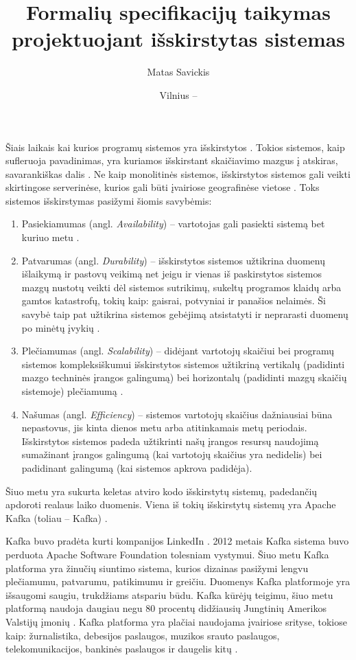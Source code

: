 \documentclass{VUMIFPSmagistrinis}
\title{Formalių specifikacijų taikymas projektuojant išskirstytas sistemas}
\author{Matas Savickis}
\date{Vilnius – \the\year}
\begin{document}
\maketitle

\tableofcontents


		Šiais laikais kai kurios programų sistemos yra išskirstytos \cite{mcr}. 
		Tokios sistemos, kaip sufleruoja pavadinimas, yra kuriamos išskirstant skaičiavimo mazgus į atskiras, savarankiškas dalis \cite{coulouris2005distributed}.
		Ne kaip monolitinės sistemos, išskirstytos sistemos gali veikti skirtingose serverinėse, kurios gali būti įvairiose geografinėse vietose \cite{shirriff2006method}.
		Toks sistemos išskirstymas pasižymi šiomis savybėmis:
		\begin{enumerate}
			\item{Pasiekiamumas (angl. {\it Availability}) -- vartotojas gali pasiekti sistemą bet kuriuo metu \cite{180327}.}
			\item{Patvarumas (angl. {\it Durability}) -- išskirstytos sistemos užtikrina duomenų išlaikymą ir pastovų veikimą net jeigu ir vienas iš paskirstytos sistemos mazgų nustotų veikti dėl sistemos sutrikimų, sukeltų programos klaidų arba gamtos katastrofų, tokių kaip: gaisrai, potvyniai ir panašios nelaimės. Ši savybė taip pat užtikrina sistemos gebėjimą atsistatyti ir neprarasti duomenų po minėtų įvykių \cite{5470366}.}
			\item{Plečiamumas (angl. {\it Scalability}) -- didėjant vartotojų skaičiui bei programų sistemos kompleksiškumui išskirstytos sistemos užtikriną vertikalų (padidinti mazgo techninės įrangos galingumą) bei horizontalų (padidinti mazgų skaičių sistemoje) plečiamumą \cite{862209}.}
			\item{Našumas (angl. {\it Efficiency}) -- sistemos vartotojų skaičius dažniausiai būna nepastovus, jis kinta dienos metu arba atitinkamais metų periodais. Išskirstytos sistemos padeda užtikrinti našų įrangos resursų naudojimą sumažinant įrangos galingumą (kai vartotojų skaičius yra nedidelis) bei padidinant galingumą (kai sistemos apkrova padidėja).}
		\end{enumerate}
		Šiuo metu yra sukurta keletas atviro kodo išskirstytų sistemų, padedančių apdoroti realaus laiko duomenis.	
		Viena iš tokių išskirstytų sistemų yra Apache Kafka (toliau -- Kafka) \cite{kfk}.


 		Kafka buvo pradėta kurti kompanijos LinkedIn \cite{kfk}.
		2012 metais Kafka sistema buvo perduota Apache Software Foundation tolesniam vystymui.
		Šiuo metu Kafka platforma yra žinučių siuntimo sistema, kurios dizainas pasižymi lengvu plečiamumu, patvarumu, patikimumu ir greičiu.
		Duomenys Kafka platformoje yra išsaugomi saugiu, trukdžiams atspariu būdu.
		Kafka kūrėjų teigimu, šiuo metu platformą naudoja daugiau negu 80 procentų didžiausių Jungtinių Amerikos Valstijų įmonių \cite{kfk}.
		Kafka platforma yra plačiai naudojama įvairiose srityse, tokiose kaip: žurnalistika, debesijos paslaugos, muzikos srauto paslaugos, telekomunikacijos, bankinės paslaugos ir daugelis kitų \cite{kfk}.
\end{document}
